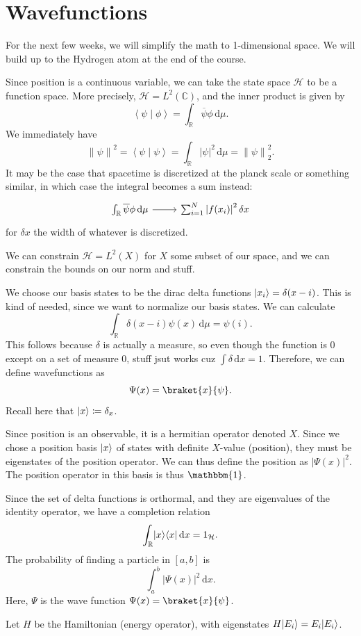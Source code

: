 \chapter{Wavefunctions}

For the next few weeks, we will simplify the math to 1-dimensional space. We will build up to the Hydrogen atom at the end of the course.

Since position is a continuous variable, we can take the state space $\mathcal{H} $ to be a function space. More precisely, $\mathcal{H} =L^2(\mathbb{C} )$, and the inner product is given by
\[
	\left\langle \psi \mid \phi  \right\rangle =\int_\mathbb{R} \overline{\psi } \phi  \,\mathrm{d} \mu 
.\]
We immediately have
\[
	\left\| \psi  \right\|^2 = \left\langle \psi \mid \psi  \right\rangle =\int_\mathbb{R} \left| \psi  \right|^2 \,\mathrm{d} \mu =\left\| \psi  \right\|_2^2
.\]
It may be the case that spacetime is discretized at the planck scale or something similar, in which case the integral becomes a sum instead:
\[\begin{tikzcd}[row sep = 2.5em, column sep = 2.5em]
	\int_{\mathbb{R} } \overline{\psi } \phi  \,\mathrm{d} \mu \arrow[r]&\sum_{i=1}^{N} \left| f(x_i) \right|^2 \delta x
\end{tikzcd}\]
for $\delta x$ the width of whatever is discretized.

We can constrain $\mathcal{H} =L^2(X)$ for $X$ some subset of our space, and we can constrain the bounds on our norm and stuff.

We choose our basis states to be the dirac delta functions $\lvert x_i\rangle =\delta(x-i)$. This is kind of needed, since we want to normalize our basis states. We can calculate
\[
	\int_\mathbb{R} \delta(x-i)\psi(x)  \,\mathrm{d} \mu =\psi (i)
.\]
This follows because $\delta $ is actually a measure, so even though the function is 0 except on a set of measure 0, stuff jsut works cuz $\int \delta  \,\mathrm{d} x=1$. Therefore, we can define wavefunctions as
\[
	\Psi (x)=\braket{x}{\psi } 
.\]
Recall here that $\lvert x\rangle \coloneqq \delta_x$.

Since position is an observable, it is a hermitian operator denoted $X$. Since we chose a position basis $\lvert x\rangle $ of states with definite $X$-value (position), they must be eigenstates of the position operator. We can thus define the position as $\left| \Psi (x) \right|^2$. The position operator in this basis is thus $\mathbbm{1}$.

Since the set of delta functions is orthormal, and they are eigenvalues of the identity operator, we have a completion relation
\[
	\int_\mathbb{R} \lvert x\rangle \langle x\rvert  \,\mathrm{d} x=1_{\mathcal{H} } 
.\]
The probability of finding a particle in $[a,b]$ is
\[
	\int_{a}^{b} \left| \Psi (x) \right|^2 \,\mathrm{d} x
.\]
Here, $\Psi $ is the wave function $\Psi (x)=\braket{x}{\psi } $.

Let $H$ be the Hamiltonian (energy operator), with eigenstates $H\lvert E_i\rangle =E_i\lvert E_i\rangle $.
